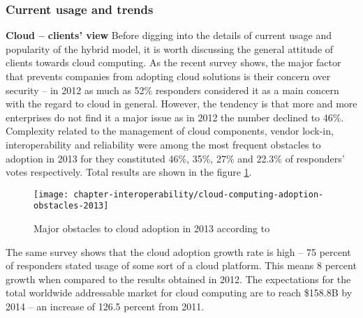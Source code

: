 \subsubsection{Current usage and trends}
\begin{asparaenum}
 \item[\textbf{Cloud -- clients' view}] Before digging into the details of current usage and popularity of the hybrid model, it is worth discussing the general attitude of clients towards cloud computing. As the recent survey \cite{NBSurvey13} shows, the major factor that prevents companies from adopting cloud solutions is their concern over security -- in 2012 as much as 52\% responders considered it as a main concern with the regard to cloud in general. However, the tendency is that more and more enterprises do not find it a major issue as in 2012 the number declined to 46\%.
Complexity related to the management of cloud components, vendor lock-in, interoperability and reliability were among the most frequent obstacles to adoption in 2013 for they constituted 46\%, 35\%, 27\% and 22.3\% of responders' votes respectively. Total results are shown in the figure \ref{fig:cloud-computing-adoption-obstacles-2013}.
\begin{figure}[!ht]
  \begin{center}
    \texttt{[image: chapter-interoperability/cloud-computing-adoption-obstacles-2013]}
  \end{center}
  \caption{Major obstacles to cloud adoption in 2013 according to \cite{NBSurvey13}}
  \label{fig:cloud-computing-adoption-obstacles-2013}
\end{figure}
The same survey shows that the cloud adoption growth rate is high -- 75 percent of responders stated usage of some sort of a cloud platform. This means 8 percent growth when compared to the results obtained in 2012. The expectations for the total worldwide addressable market for cloud computing are to reach \$158.8B by 2014 -- an increase of 126.5 percent from 2011.
 

\end{asparaenum}

